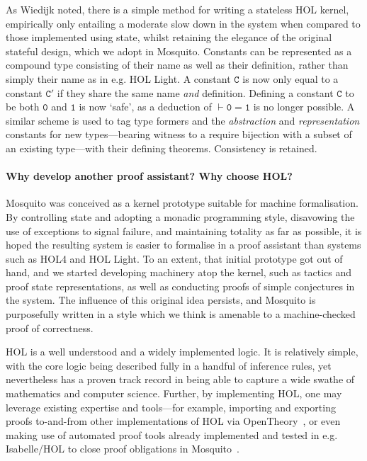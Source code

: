 \documentclass{llncs}
\newcommand{\mosquito}{Mosquito\xspace}
\begin{document}
As Wiedijk noted, there is a simple method for writing a stateless HOL kernel, empirically only entailing a moderate slow down in the system when compared to those implemented using state, whilst retaining the elegance of the original stateful design, which we adopt in \mosquito.
Constants can be represented as a compound type consisting of their name as well as their definition, rather than simply their name as in e.g. HOL Light.
A constant $\mathtt{C}$ is now only equal to a constant $\mathtt{C'}$ if they share the same name \emph{and} definition.
Defining a constant $\mathtt{C}$ to be both $\mathtt{0}$ and $\mathtt{1}$ is now `safe', as a deduction of $\vdash \mathtt{0 = 1}$ is no longer possible.
A similar scheme is used to tag type formers and the \emph{abstraction} and \emph{representation} constants for new types---bearing witness to a require bijection with a subset of an existing type---with their defining theorems.
Consistency is retained.

\paragraph{Why develop another proof assistant?  Why choose HOL?}
\mosquito was conceived as a kernel prototype suitable for machine formalisation.
By controlling state and adopting a monadic programming style, disavowing the use of exceptions to signal failure, and maintaining totality as far as possible, it is hoped the resulting system is easier to formalise in a proof assistant than systems such as HOL4 and HOL Light.
To an extent, that initial prototype got out of hand, and we started developing machinery atop the kernel, such as tactics and proof state representations, as well as conducting proofs of simple conjectures in the system.
The influence of this original idea persists, and \mosquito is purposefully written in a style which we think is amenable to a machine-checked proof of correctness.

HOL is a well understood and a widely implemented logic.
It is relatively simple, with the core logic being described fully in a handful of inference rules, yet nevertheless has a proven track record in being able to capture a wide swathe of mathematics and computer science.
Further, by implementing HOL, one may leverage existing expertise and tools---for example, importing and exporting proofs to-and-from other implementations of HOL via OpenTheory~\cite{hurd:opentheory:2011}, or even making use of automated proof tools already implemented and tested in e.g. Isabelle/HOL to close proof obligations in \mosquito~\cite{kumar:standalone:2012}.
\end{document}
